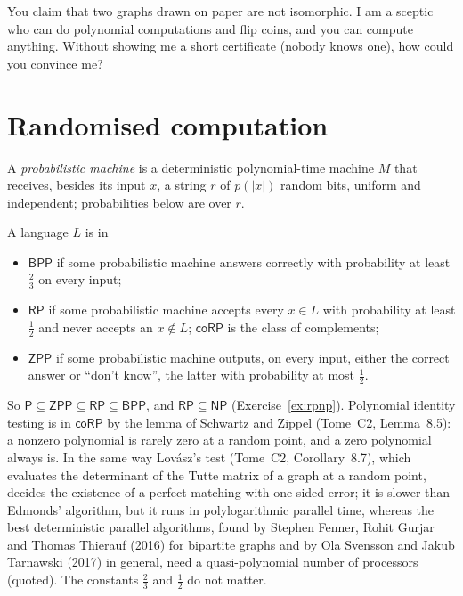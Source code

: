 \begin{think}
You claim that two graphs drawn on paper are not isomorphic. I am a sceptic who can do polynomial computations and flip coins, and you can compute anything. Without showing me a short certificate (nobody knows one), how could you convince me?
\end{think}

\section{Randomised computation}\label{sec:bpp}

A \emph{probabilistic machine} is a deterministic polynomial-time machine $M$ that receives, besides its input $x$, a string $r$ of $p(|x|)$ random bits, uniform and independent; probabilities below are over $r$.

\begin{definition}\label{def:bpp}
A language $L$ is in
\begin{itemize}
\item $\mathsf{BPP}$ if some probabilistic machine answers correctly with probability at least $\frac23$ on every input;
\item $\mathsf{RP}$ if some probabilistic machine accepts every $x\in L$ with probability at least $\frac12$ and never accepts an $x\notin L$; $\mathsf{coRP}$ is the class of complements;
\item $\mathsf{ZPP}$ if some probabilistic machine outputs, on every input, either the correct answer or ``don't know'', the latter with probability at most $\frac12$.
\end{itemize}
\end{definition}

So $\mathsf P\subseteq\mathsf{ZPP}\subseteq\mathsf{RP}\subseteq\mathsf{BPP}$, and $\mathsf{RP}\subseteq\mathsf{NP}$ (Exercise~\ref{ex:rpnp}). Polynomial identity testing is in $\mathsf{coRP}$ by the lemma of Schwartz and Zippel (Tome~C2, Lemma~8.5): a nonzero polynomial is rarely zero at a random point, and a zero polynomial always is. In the same way Lov\'asz's test (Tome~C2, Corollary~8.7), which evaluates the determinant of the Tutte matrix of a graph at a random point, decides the existence of a perfect matching with one-sided error; it is slower than Edmonds' algorithm, but it runs in polylogarithmic parallel time, whereas the best deterministic parallel algorithms, found by Stephen Fenner, Rohit Gurjar and Thomas Thierauf (2016) for bipartite graphs and by Ola Svensson and Jakub Tarnawski (2017) in general, need a quasi-polynomial number of processors (quoted). The constants $\frac23$ and $\frac12$ do not matter.

